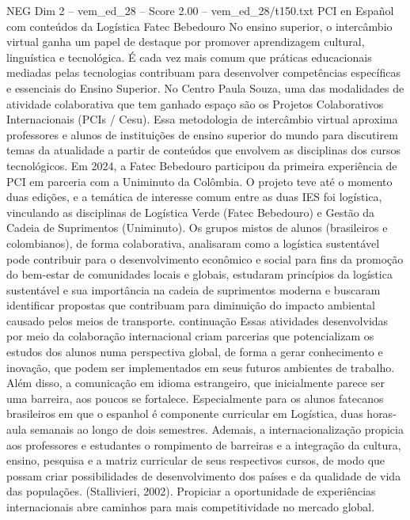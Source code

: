 \begin{textsample}{NEG Dim 2 – vem\_ed\_28 – Score 2.00 – vem\_ed\_28/t150.txt}  \label{ex:f2_neg_058}
PCI en Español com conteúdos da Logística Fatec Bebedouro No ensino superior, o intercâmbio virtual ganha um papel de destaque por promover aprendizagem cultural, linguística e tecnológica.
É cada vez mais comum que práticas educacionais mediadas pelas tecnologias contribuam para desenvolver competências específicas e essenciais do Ensino Superior.
No Centro Paula Souza, uma das modalidades de atividade colaborativa que tem ganhado espaço são os Projetos Colaborativos Internacionais (PCIs / Cesu).
Essa metodologia de intercâmbio virtual aproxima professores e alunos de instituições de ensino superior do mundo para discutirem temas da atualidade a partir de conteúdos que envolvem as disciplinas dos cursos tecnológicos.
Em 2024, a Fatec Bebedouro participou da primeira experiência de PCI em parceria com a Uniminuto da Colômbia.
O projeto teve até o momento duas edições, e a temática de interesse comum entre as duas IES foi logística, vinculando as disciplinas de Logística Verde (Fatec Bebedouro) e Gestão da Cadeia de Suprimentos (Uniminuto).
Os grupos mistos de alunos (brasileiros e colombianos), de forma colaborativa, analisaram como a logística sustentável pode contribuir para o desenvolvimento econômico e social para fins da promoção do bem-estar de comunidades locais e globais, estudaram princípios da logística sustentável e sua importância na cadeia de suprimentos moderna e buscaram identificar propostas que contribuam para diminuição do impacto ambiental causado pelos meios de transporte. continuação Essas atividades desenvolvidas por meio da colaboração internacional criam parcerias que potencializam os estudos dos alunos numa perspectiva global, de forma a gerar conhecimento e inovação, que podem ser implementados em seus futuros ambientes de trabalho.
Além disso, a comunicação em idioma estrangeiro, que inicialmente parece ser uma barreira, aos poucos se fortalece.
Especialmente para os alunos fatecanos brasileiros em que o espanhol é componente curricular em Logística, duas horas-aula semanais ao longo de dois semestres.
Ademais, a internacionalização propicia aos professores e estudantes o rompimento de barreiras e a integração da cultura, ensino, pesquisa e a matriz curricular de seus respectivos cursos, de modo que possam criar possibilidades de desenvolvimento dos países e da qualidade de vida das populações. (Stallivieri, 2002).
Propiciar a oportunidade de experiências internacionais abre caminhos para mais competitividade no mercado global.

\end{textsample}
